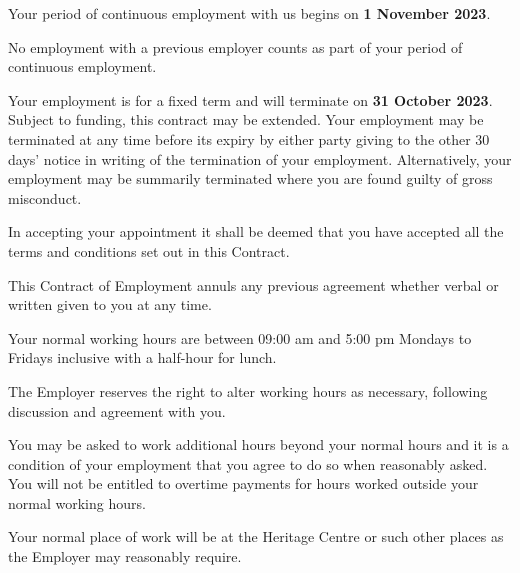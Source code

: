 \documentclass[a4paper,11pt,onecolumn ]{article}
\begin{document}
\begin{legal}
\item {}
\begin{legal}
  \item Your period of continuous employment with us begins on \textbf{1 November 2023}.
  \item No employment with a previous employer counts as part of your period of
  continuous employment.
  \item Your employment is for a fixed term and will terminate on \textbf{31 October 2023}.
  Subject to funding, this contract may be extended. Your employment may be
  terminated at any time before its expiry by either party giving to the other 30
  days’ notice in writing of the termination of your employment. Alternatively,
  your employment may be summarily terminated where you are found guilty of
  gross misconduct.
  \item In accepting your appointment it shall be deemed that you have accepted all the
  terms and conditions set out in this Contract.
  \item This Contract of Employment annuls any previous agreement whether verbal or
  written given to you at any time.
\end{legal}


\item {}
\begin{legal}
\item Your normal working hours are between 09:00 am and 5:00 pm Mondays to
Fridays inclusive with a half-hour for lunch.
\item The Employer reserves the right to alter working hours as necessary, following
discussion and agreement with you.
\item You may be asked to work additional hours beyond your normal hours and it is
a condition of your employment that you agree to do so when reasonably asked.
You will not be entitled to overtime payments for hours worked outside your
normal working hours.
\end{legal}


\item {}
Your normal place of work will be at the Heritage Centre or such other places
as the Employer may reasonably require.


\end{legal}
\end{document}
